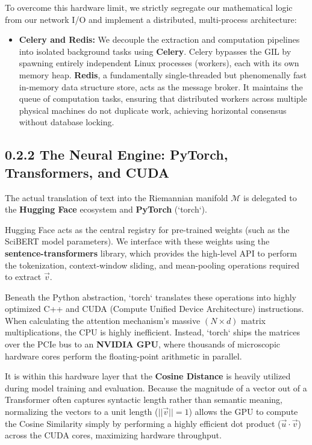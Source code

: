 To overcome this hardware limit, we strictly segregate our mathematical logic from our network I/O and implement a distributed, multi-process architecture:
\begin{itemize}
    \item \textbf{Celery and Redis:} We decouple the extraction and computation pipelines into isolated background tasks using \textbf{Celery}. Celery bypasses the GIL by spawning entirely independent Linux processes (workers), each with its own memory heap. \textbf{Redis}, a fundamentally single-threaded but phenomenally fast in-memory data structure store, acts as the message broker. It maintains the queue of computation tasks, ensuring that distributed workers across multiple physical machines do not duplicate work, achieving horizontal consensus without database locking.
\end{itemize}

\subsection*{0.2.2 The Neural Engine: PyTorch, Transformers, and CUDA}

The actual translation of text into the Riemannian manifold $\mathcal{M}$ is delegated to the \textbf{Hugging Face} ecosystem and \textbf{PyTorch} (`torch`).

Hugging Face acts as the central registry for pre-trained weights (such as the SciBERT model parameters). We interface with these weights using the \textbf{sentence-transformers} library, which provides the high-level API to perform the tokenization, context-window sliding, and mean-pooling operations required to extract $\vec{v}$.

Beneath the Python abstraction, `torch` translates these operations into highly optimized C++ and CUDA (Compute Unified Device Architecture) instructions. When calculating the attention mechanism's massive $(N \times d)$ matrix multiplications, the CPU is highly inefficient. Instead, `torch` ships the matrices over the PCIe bus to an \textbf{NVIDIA GPU}, where thousands of microscopic hardware cores perform the floating-point arithmetic in parallel.

It is within this hardware layer that the \textbf{Cosine Distance} is heavily utilized during model training and evaluation. Because the magnitude of a vector out of a Transformer often captures syntactic length rather than semantic meaning, normalizing the vectors to a unit length ($||\vec{v}|| = 1$) allows the GPU to compute the Cosine Similarity simply by performing a highly efficient dot product ($\vec{u} \cdot \vec{v}$) across the CUDA cores, maximizing hardware throughput.

